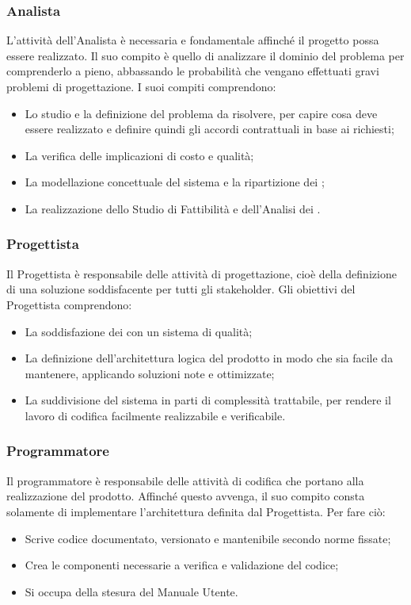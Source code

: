 \documentclass[NormeDiProgetto.tex]{subfiles}
\begin{document}
	\subsubsection{Analista}
	L'attività dell'Analista è necessaria e fondamentale affinché il progetto possa essere realizzato. Il suo compito è quello di analizzare il dominio del problema per comprenderlo a pieno, abbassando le probabilità che vengano effettuati gravi problemi di progettazione. I suoi compiti comprendono:
	\begin{itemize}
		\item Lo studio e la definizione del problema da risolvere, per capire cosa deve essere realizzato e definire quindi gli accordi contrattuali in base ai  richiesti;
		\item La verifica delle implicazioni di costo e qualità;
		\item La modellazione concettuale del sistema e la ripartizione dei ;
		\item La realizzazione dello Studio di Fattibilità e dell'Analisi dei .
	\end{itemize}
	\subsubsection{Progettista}
	Il Progettista è responsabile delle attività di progettazione, cioè della definizione di una soluzione soddisfacente per tutti gli stakeholder. Gli obiettivi del Progettista comprendono:
	\begin{itemize}
		\item La soddisfazione dei  con un sistema di qualità;
		\item La definizione dell'architettura logica del prodotto in modo che sia facile da mantenere, applicando soluzioni note e ottimizzate;
		\item La suddivisione del sistema in parti di complessità trattabile, per rendere il lavoro di codifica facilmente realizzabile e verificabile.
	\end{itemize} 

	\subsubsection{Programmatore}
	Il programmatore è responsabile delle attività di codifica che portano alla realizzazione del prodotto. Affinché questo avvenga, il suo compito consta solamente di implementare l'architettura definita dal Progettista. Per fare ciò:
	\begin{itemize}
		\item Scrive codice documentato, versionato e mantenibile secondo norme fissate;
		\item Crea le componenti necessarie a verifica e validazione del codice;
		\item Si occupa della stesura del Manuale Utente.
	\end{itemize}
\end{document}
